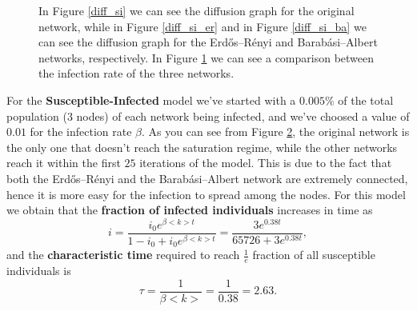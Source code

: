 \begin{figure}[H]
        \begin{subfigure}{0.45\textwidth}
            \caption{}
            \label{diff_si_comparison}
        \end{subfigure}
        \caption{In Figure \ref{diff_si} we can see the diffusion graph for the original network, while in Figure
        \ref{diff_si_er} and in Figure \ref{diff_si_ba} we can see the diffusion graph for the Erdős–Rényi and
        Barabási–Albert networks, respectively. In Figure \ref{diff_si_comparison} we can see a comparison between
        the infection rate of the three networks.}
        \label{diff_si_total}
    \end{figure}
    For the \textbf{Susceptible-Infected} model we've started with a $0.005\%$ of the total population ($3$ nodes)
    of each network being infected, and we've choosed a value of $0.01$ for the infection rate $\beta$. As you can
    see from Figure \ref{diff_si_total}, the original network is the only one that doesn't reach the saturation
    regime, while the other networks reach it within the first $25$ iterations of the model. This is due to the fact
    that both the Erdős–Rényi and the Barabási–Albert network are extremely connected, hence it is more easy for the
    infection to spread among the nodes. For this model we obtain that the \textbf{fraction of infected individuals}
    increases in time as
    \begin{equation*}
        i = \frac{i_0 e^{\beta<k>t}}{1 - i_0 + i_0 e^{\beta<k>t}} = \frac{3 e^{0.38t}}{65726 + 3 e^{0.38t}},
    \end{equation*}
    and the \textbf{characteristic time} required to reach $\frac{1}{e}$ fraction of all susceptible individuals is
    \begin{equation*}
        \tau = \frac{1}{\beta<k>} = \frac{1}{0.38} = 2.63.
    \end{equation*}

